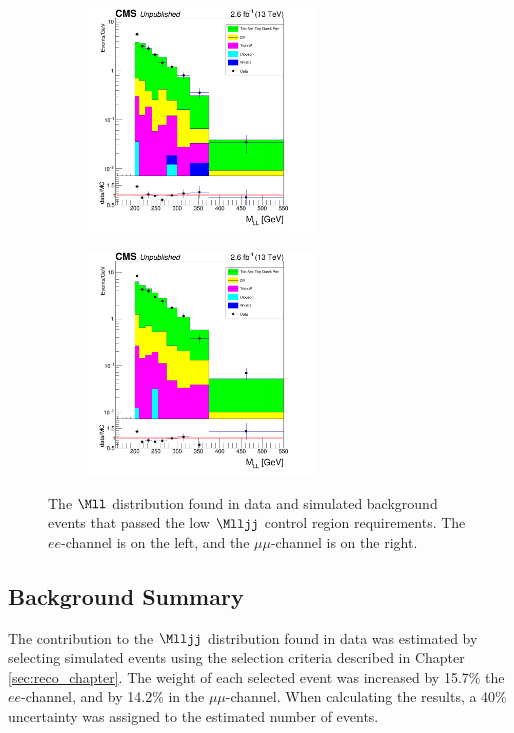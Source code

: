 \begin{figure}
	\centering
	\begin{subfigure}[t]{2.4in}
		\centering
		\includegraphics[width=2.4in]{figures/Mll_eeChnl_lowMlljjCR.png}
	\end{subfigure}
	\thickspace
	\begin{subfigure}[t]{2.4in}
		\centering
		\includegraphics[width=2.4in]{figures/Mll_mumuChnl_lowMlljjCR.png}
	\end{subfigure}
	\caption{The $\Mll$ distribution found in data and simulated background events that passed the low $\Mlljj$ control region 
		requirements.  The $ee$-channel is on the left, and the $\mu\mu$-channel is on the right.}
	\label{fig:mllInLowMlljjSideband}
\end{figure}

\subsection{\DY Background Summary}
The \DY contribution to the $\Mlljj$ distribution found in data was estimated by selecting simulated \DY events using the selection criteria 
described in Chapter \ref{sec:reco_chapter}.  The weight of each selected event was increased by 15.7\% the $ee$-channel, and by 14.2\% in 
the $\mu\mu$-channel.  When calculating the results, a 40\% uncertainty was assigned to the estimated number of \DY events.


